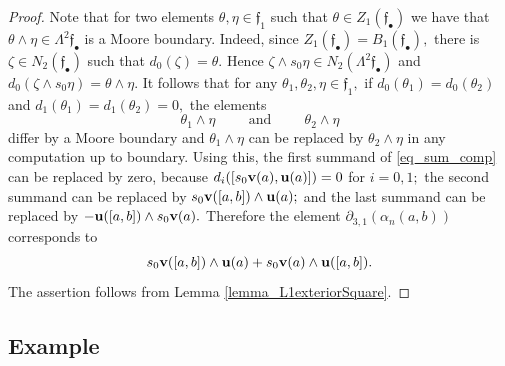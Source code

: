 \documentclass{amsart}
\numberwithin{equation}{section}
\theoremstyle{definition}
\def\ff{\mathfrak{f}}
\begin{document}
\begin{proof}
Note that for two elements $\theta, \eta \in \ff_1$ such that $\theta\in Z_1(\ff_\bullet)$  we have that $\theta \wedge \eta \in \Lambda^2 \ff_\bullet$ is a Moore boundary. Indeed, since $Z_1(\ff_\bullet)=B_1(\ff_\bullet),$ there is $\zeta\in N_2(\ff_\bullet) $ such that $d_0(\zeta)=\theta.$ Hence $\zeta\wedge s_0\eta \in N_2(\Lambda^2 \ff_\bullet )$ and $d_0( \zeta \wedge s_0\eta)=\theta \wedge \eta.$  It follows that for any $\theta_1,\theta_2,\eta \in \ff_1,$ if $d_0(\theta_1)=d_0(\theta_2)$ and $d_1(\theta_1)=d_1(\theta_2)=0,$ the elements $$\theta_1 \wedge \eta \hspace{1cm} \text{and} \hspace{1cm} \theta_2 \wedge \eta  $$
differ by a Moore boundary and $\theta_1\wedge \eta$ can be replaced by $\theta_2\wedge \eta$ in any computation up to boundary.  Using this, the first summand  of \eqref{eq_sum_comp} can be replaced by zero, because $d_i([s_0{\bf v}(a),{\bf u}(a)] )=0 $ for $i=0,1;$ the second summand can be replaced by $ s_0{\bf v}([a,b]) \wedge {\bf u}(a);$ and the last summand can be replaced by $-{\bf u}([a,b])\wedge s_0{\bf v}(a).$ Therefore the element $\partial_{3,1}(\alpha_n(a,b))$ corresponds to 
$$s_0{\bf v}([a,b])\wedge {\bf u}(a) + s_0{\bf v}(a) \wedge {\bf u}([a,b]).$$
The assertion follows from Lemma  \ref{lemma_L1exteriorSquare}.
\end{proof}

\subsection{Example}

 
\end{document}
